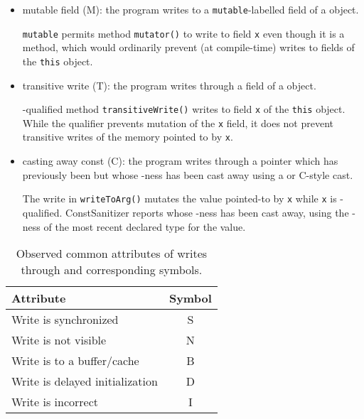 \begin{itemize}
  \item mutable field (M): the program writes to a \texttt{mutable}-labelled
        field of a \const{} object.
        \begin{center}
          
        \end{center}
        \texttt{mutable} permits method \texttt{mutator()} to
        write to field \texttt{x} even though it is a \const{} method, which
        would ordinarily prevent (at compile-time) writes to fields of the
        \texttt{this} object.

  \item transitive write (T): the program writes through a field of a \const{}
        object.
        \begin{center}
          
        \end{center}
        \const{}-qualified method \texttt{transitiveWrite()} writes to
        field \texttt{x} of the \texttt{this} object.
        While the \const{} qualifier prevents mutation of the \texttt{x} field,
        it does not prevent transitive writes of the memory pointed to by
        \texttt{x}.

  \item casting away const (C): the program writes through a pointer which has
        previously been \const{} but whose \const{}-ness has been cast away
        using a  or C-style cast.
        \begin{center}
          
        \end{center}
        The write in \texttt{writeToArg()} mutates the value pointed-to by
        \texttt{x} while \texttt{x} is \const{}-qualified.
        ConstSanitizer reports \wstcqs{} whose \const{}-ness has been
        cast away, using the \const{}-ness of the most recent
        declared type for the value.
\end{itemize}

\vspace*{-1em}
\begin{table}[ht!]
  \caption{Observed common attributes of writes through \const{} and corresponding
           symbols.}
  \label{table:classification-reference}
  \centering
  \begin{tabular}{l c}
    \textbf{Attribute} & \textbf{Symbol} \\
    \midrule
    Write is synchronized & S \\
    Write is not visible  & N \\
    Write is to a buffer/cache & B \\
    Write is delayed initialization & D \\
    Write is incorrect & I \\
  \end{tabular}
\end{table}

